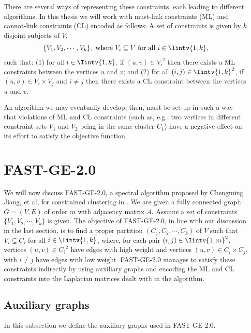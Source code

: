 There are several ways of representing these constraints, each leading to different algorithms. 
In this thesis we will work with must-link constraints (ML) and cannot-link constraints (CL) encoded as follows:
A set of constraints is given by $k$ disjoint subjects of $V$,
\begin{equation}
   \{ V_1, V_2, \cdots, V_k \}, \text{ where } V_i \subseteq V \text{ for all } i \in \Iintv{1,k},
\end{equation}
such that: (1) for all $i \in \Iintv{1,k}$, if $(u,v) \in {V_i}^2$ then there exists a ML constraints between the vertices $u$ and $v$; and (2) for all $(i,j) \in \Iintv{1,k}^2$, if $(u,v) \in V_i \times V_j$ and $i \ne j$ then there exists a CL constraint between the vertices $u$ and $v$. 

An algorithm we may eventually develop, then, must be set up in such a way that violations of ML and CL constraints (such as, e.g., two vertices in different constraint sets $V_1$ and $V_2$ being in the same cluster $C_1$) have a negative effect on its effort to satisfy the objective function.

\section{FAST-GE-2.0}
We will now discuss FAST-GE-2.0, a spectral algorithm proposed by Chengming Jiang, et al, for constrained clustering in \cite{fastge2}.
We are given a fully connected graph $G = (V,E)$ of order $m$ with adjacency matrix $A$.
Assume a set of constraints $\{V_1, V_2, \cdots, V_k \}$ is given.
The objective of FAST-GE-2.0, in line with our discussion in the last section, is to find a proper partition $(C_1, C_2, \cdots, C_k)$ of $V$ such that $V_i \subseteq C_i$ for all $i \in \Iintv{1,k}$, where, for each pair $(i,j) \in \Iintv{1,m}^2$, vertices $(u,v) \in {C_i}^2$ have edges with high weight and vertices $(u,v) \in {C_i} \times {C_j}$, with $i \ne j$ have edges with low weight.
FAST-GE-2.0 manages to satisfy these constraints indirectly by using auxiliary graphs and encoding the ML and CL constraints into the Laplacian matrices dealt with in the algorithm.

\subsection{Auxiliary graphs}
In this subsection we define the auxiliary graphs used in FAST-GE-2.0.

